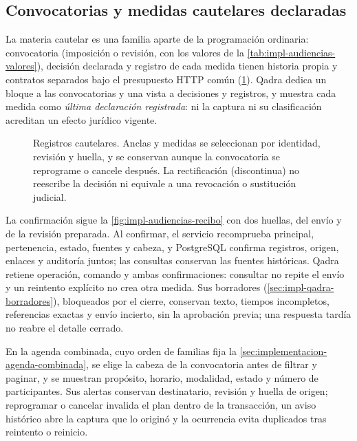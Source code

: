 
\subsection{Convocatorias y medidas cautelares declaradas}\label{sec:impl-cautelares}

La materia cautelar es una familia aparte de la programación ordinaria: convocatoria (imposición o revisión, con los valores de la \cref{tab:impl-audiencias-valores}), decisión declarada y registro de cada medida tienen historia propia y contratos separados bajo el presupuesto HTTP común (\cref{fig:impl-cautelares-estructura}). Qadra dedica un bloque a las convocatorias y una vista a decisiones y registros, y muestra cada medida como \emph{última declaración registrada}: ni la captura ni su clasificación acreditan un efecto jurídico vigente.

\begin{figure}[!hb]
  \centering
  
  \caption{Registros cautelares. Anclas y medidas se seleccionan por identidad, revisión y huella, y se conservan aunque la convocatoria se reprograme o cancele después. La rectificación (discontinua) no reescribe la decisión ni equivale a una revocación o sustitución judicial.}
  \label{fig:impl-cautelares-estructura}
\end{figure}

La confirmación sigue la \cref{fig:impl-audiencias-recibo} con dos huellas, del envío y de la revisión preparada. Al confirmar, el servicio recomprueba principal, pertenencia, estado, fuentes y cabeza, y PostgreSQL confirma registros, origen, enlaces y auditoría juntos; las consultas conservan las fuentes históricas. Qadra retiene operación, comando y ambas confirmaciones: consultar no repite el envío y un reintento explícito no crea otra medida. Sus borradores (\cref{sec:impl-qadra-borradores}), bloqueados por el cierre, conservan texto, tiempos incompletos, referencias exactas y envío incierto, sin la aprobación previa; una respuesta tardía no reabre el detalle cerrado.

En la agenda combinada, cuyo orden de familias fija la \cref{sec:implementacion-agenda-combinada}, se elige la cabeza de la convocatoria antes de filtrar y paginar, y se muestran propósito, horario, modalidad, estado y número de participantes. Sus alertas conservan destinatario, revisión y huella de origen; reprogramar o cancelar invalida el plan dentro de la transacción, un aviso histórico abre la captura que lo originó y la ocurrencia evita duplicados tras reintento o reinicio.

